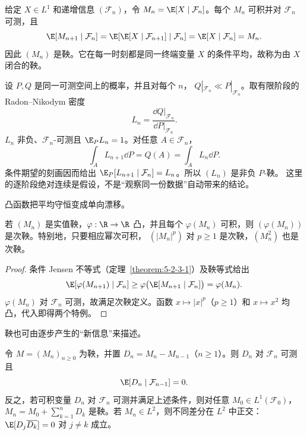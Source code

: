 \begin{example}[闭鞅]\label{ex:6-2-1-2}
给定 $X\in L^1$ 和递增信息 $(\mathcal F_n)$，令
$M_n=\E[X\mid\mathcal F_n]$。每个 $M_n$ 可积并对 $\mathcal F_n$ 可测，且
\[
  \E[M_{n+1}\mid\mathcal F_n]
  =\E[\E[X\mid\mathcal F_{n+1}]\mid\mathcal F_n]
  =\E[X\mid\mathcal F_n]=M_n.
\]
因此 $(M_n)$ 是鞅。它在每一时刻都是同一终端变量 $X$ 的条件平均，故称为由 $X$ 闭合的鞅。
\end{example}

\begin{example}[似然比鞅]\label{ex:6-2-1-3}
设 $P,Q$ 是同一可测空间上的概率，并且对每个 $n$，
$Q|_{\mathcal F_n}\ll P|_{\mathcal F_n}$。取有限阶段的 Radon--Nikodym 密度
\[
  L_n=\frac{\dd Q|_{\mathcal F_n}}{\dd P|_{\mathcal F_n}}.
\]
$L_n$ 非负、$\mathcal F_n$-可测且 $\E_P L_n=1$。对任意
$A\in\mathcal F_n$，
\[
 \int_A L_{n+1}\dd P=Q(A)=\int_A L_n\dd P.
\]
条件期望的刻画因而给出
$\E_P[L_{n+1}\mid\mathcal F_n]=L_n$。所以 $(L_n)$ 是非负 $P$-鞅。
这里的逐阶段绝对连续是假设，不是“观察同一份数据”自动带来的结论。
\end{example}

凸函数把平均守恒变成单向漂移。

\begin{theorem}\label{theorem:6-2-1-2}
若 $(M_n)$ 是实值鞅，$\varphi:\R\to\R$ 凸，并且每个
$\varphi(M_n)$ 可积，则 $(\varphi(M_n))$ 是次鞅。特别地，只要相应幂次可积，
$(|M_n|^p)$ 对 $p\ge1$ 是次鞅，$(M_n^2)$ 也是次鞅。
\end{theorem}

\begin{proof}
条件 Jensen 不等式（定理~\ref{theorem:5-2-3-1}）及鞅等式给出
\[
 \E[\varphi(M_{n+1})\mid\mathcal F_n]
 \ge \varphi\bigl(\E[M_{n+1}\mid\mathcal F_n]\bigr)
 =\varphi(M_n).
\]
$\varphi(M_n)$ 对 $\mathcal F_n$ 可测，故满足次鞅定义。函数
$x\mapsto|x|^p$（$p\ge1$）和 $x\mapsto x^2$ 均凸，代入即得两个特例。
\end{proof}

鞅也可由逐步产生的“新信息”来描述。

\begin{proposition}[鞅差分分解]\label{proposition:6-2-1-3}
令 $M=(M_n)_{n\ge0}$ 为鞅，并置 $D_n=M_n-M_{n-1}$（$n\ge1$）。则
$D_n$ 对 $\mathcal F_n$ 可测且
\[
  \E[D_n\mid\mathcal F_{n-1}]=0.
\]
反之，若可积变量 $D_n$ 对 $\mathcal F_n$ 可测并满足上述条件，则对任意
$M_0\in L^1(\mathcal F_0)$，
$M_n=M_0+\sum_{k=1}^nD_k$ 是鞅。若 $M_n\in L^2$，则不同差分在 $L^2$ 中正交：
$\E[D_j\overline{D_k}]=0$ 对 $j\ne k$ 成立。
\end{proposition}

